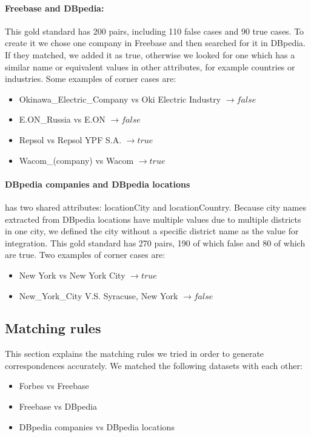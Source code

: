 \paragraph{Freebase and DBpedia:} This gold standard has 200 pairs, including 110 false cases and 90 true cases. To create it we chose one company in Freebase and then searched for it in DBpedia. If they matched, we added it as true, otherwise we looked for one which has a similar name or equivalent values in other attributes, for example countries or industries. Some examples of corner cases are:
\begin{itemize}[noitemsep,topsep=0pt,parsep=0pt,partopsep=0pt]
\item Okinawa\_Electric\_Company vs Oki Electric Industry $\longrightarrow false$
\item E.ON\_Russia vs E.ON $\longrightarrow false$
\item Repsol vs Repsol YPF S.A. $\longrightarrow true$
\item Wacom\_(company) vs Wacom $\longrightarrow true$
\end{itemize}


\paragraph{DBpedia companies and DBpedia locations} has two shared attributes: locationCity and locationCountry. Because city names extracted from DBpedia locations have multiple values due to multiple districts in one city, we defined the city without a specific district name as the value for integration. This gold standard has 270 pairs, 190 of which false and 80 of which are true. Two examples of corner cases are: 
\begin{itemize}[noitemsep,topsep=0pt,parsep=0pt,partopsep=0pt]
\item New York vs New York City $\longrightarrow true$
\item New\_York\_City V.S. Syracuse, New York $\longrightarrow false$
\end{itemize}


\newpage
\subsection{Matching rules}
This section explains the matching rules we tried in order to generate correspondences accurately. We matched the following datasets with each other:
\begin{itemize}[noitemsep,topsep=0pt,parsep=0pt,partopsep=0pt]
\item Forbes vs Freebase
\item Freebase vs DBpedia
\item DBpedia companies vs DBpedia locations
\end{itemize}

